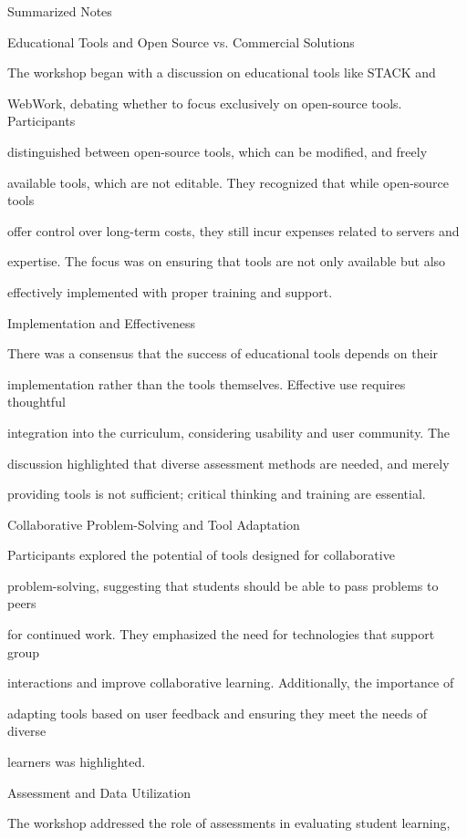 \documentclass[11pt]{article}
\begin{document}
Summarized Notes

Educational Tools and Open Source vs. Commercial Solutions

The workshop began with a discussion on educational tools like STACK and

WebWork, debating whether to focus exclusively on open-source tools. Participants

distinguished between open-source tools, which can be modified, and freely

available tools, which are not editable. They recognized that while open-source tools

offer control over long-term costs, they still incur expenses related to servers and

expertise. The focus was on ensuring that tools are not only available but also

effectively implemented with proper training and support.

Implementation and Effectiveness

There was a consensus that the success of educational tools depends on their

implementation rather than the tools themselves. Effective use requires thoughtful

integration into the curriculum, considering usability and user community. The

discussion highlighted that diverse assessment methods are needed, and merely

providing tools is not sufficient; critical thinking and training are essential.

Collaborative Problem-Solving and Tool Adaptation

Participants explored the potential of tools designed for collaborative

problem-solving, suggesting that students should be able to pass problems to peers

for continued work. They emphasized the need for technologies that support group

interactions and improve collaborative learning. Additionally, the importance of

adapting tools based on user feedback and ensuring they meet the needs of diverse

learners was highlighted.

Assessment and Data Utilization

The workshop addressed the role of assessments in evaluating student learning,
\end{document}
